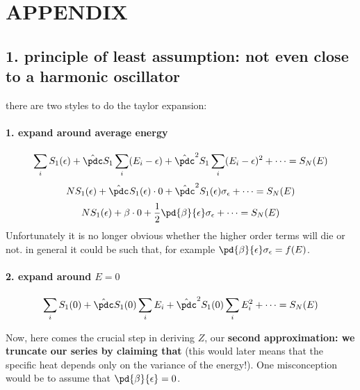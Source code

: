 \section{APPENDIX}
        \subsection{1. principle of least assumption: not even close to a harmonic oscillator}
        there are two styles to do the taylor expansion:
        
        \paragraph{1. expand around average energy \aE}
        \[ \soi S_1(\aE) +  \hat\pdc S_1 \soi(E_i-\aE) +  {\hat\pdc}^2 S_1 \soi (E_i-\aE)^2 + \cdots  = S_N(E) \]
        \[ NS_1(\aE) + \Stothei{} \cdot 0 + \Stothei{2}\sigma_\aE + \cdots = S_N(E)   \]
        \[ NS_1(\aE) + \beta \cdot 0 + \frac12\pd{\beta}{\aE}\sigma_\aE + \cdots = S_N(E)   \]
        Unfortunately it is no longer obvious whether the higher order terms will die or not. in general it could be such that, for example $ \pd{\beta}{\aE}\sigma_\aE = f(E)$.

        \paragraph{2. expand around $E=0$}
        \[ \soi S_1(0) +  \hat\pdc S_1(0) \soi E_i +  {\hat\pdc}^2 S_1(0) \soi E_i^2 + \cdots  = S_N(E) \]

         Now, here comes the crucial step in deriving $Z$, our \textbf{ second approximation: we truncate our series by claiming that  }(this would later means that the specific heat depends only on the variance of the energy!). One misconception would be to assume that $\pd{\beta}{\aE}=0$.


